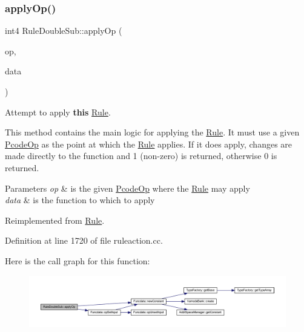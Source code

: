 \subsubsection{\texorpdfstring{applyOp()}{applyOp()}}
{\footnotesize\ttfamily int4 Rule\+Double\+Sub\+::apply\+Op (\begin{DoxyParamCaption}\item[{\mbox{\hyperlink{class_pcode_op}{Pcode\+Op}} $\ast$}]{op,  }\item[{\mbox{\hyperlink{class_funcdata}{Funcdata}} \&}]{data }\end{DoxyParamCaption})\hspace{0.3cm}{\ttfamily [virtual]}}



Attempt to apply {\bfseries{this}} \mbox{\hyperlink{class_rule}{Rule}}. 

This method contains the main logic for applying the \mbox{\hyperlink{class_rule}{Rule}}. It must use a given \mbox{\hyperlink{class_pcode_op}{Pcode\+Op}} as the point at which the \mbox{\hyperlink{class_rule}{Rule}} applies. If it does apply, changes are made directly to the function and 1 (non-\/zero) is returned, otherwise 0 is returned. 
\begin{DoxyParams}{Parameters}
{\em op} & is the given \mbox{\hyperlink{class_pcode_op}{Pcode\+Op}} where the \mbox{\hyperlink{class_rule}{Rule}} may apply \\
\hline
{\em data} & is the function to which to apply \\
\hline
\end{DoxyParams}


Reimplemented from \mbox{\hyperlink{class_rule_a4e3e61f066670175009f60fb9dc60848}{Rule}}.



Definition at line 1720 of file ruleaction.\+cc.

Here is the call graph for this function\+:
\nopagebreak
\begin{figure}[H]
\begin{center}
\leavevmode
\includegraphics[width=350pt]{class_rule_double_sub_a5dac7faa4ee8464a136b3bec0e2057ab_cgraph}
\end{center}
\end{figure}
\mbox{\label{class_rule_double_sub_a147bf9b04ba739cbf37cfad58970b23c}} 
